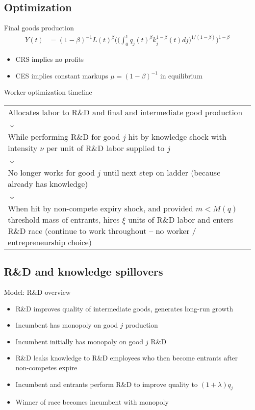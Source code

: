 \subsection{Optimization}
\begin{frame}{Final goods production}
\begin{align*}
Y(t) &= (1-\beta)^{-1} L(t)^{\beta}\Bigg(\Big(\int_0^1 q_j(t)^\beta 
k_j^{1-\beta}(t)dj \Big)^{1/(1-\beta)}\Bigg)^{1-\beta}
\end{align*}
\begin{itemize}
	\item CRS implies no profits
	\item CES implies constant markups $\mu = (1-\beta)^{-1}$ in equilibrium
	
\end{itemize}
\end{frame}

\begin{frame}{Worker optimization timeline}
\begin{table}
	\begin{tabular}{p{}}
		\centering
		Allocates labor to R\&D and final and intermediate good production \\
		$\downarrow$\\
		While performing R\&D for good $j$ hit by knowledge shock with intensity $\nu$ per unit of R\&D labor supplied to $j$ \\
		$\downarrow$\\
		No longer works for good $j$ until next step on ladder (because already has knowledge) \\
		$\downarrow$\\
		When hit by non-compete expiry shock, and provided $m<M(q)$ threshold mass of entrants, hires $\xi$ units of R\&D labor and enters R\&D race (continue to work throughout -- no worker / entrepreneurship choice)
	\end{tabular}
\end{table}
\end{frame}

\subsection{R\&D and knowledge spillovers}
\begin{frame}{Model: R\&D overview}
\begin{itemize}
	\item R\&D improves quality of intermediate goods, generates long-run growth
	\item Incumbent has monopoly on good $j$ production
	\item Incumbent initially has monopoly on good $j$ R\&D
	\item R\&D leaks knowledge to R\&D employees who then become entrants after non-competes expire 
	\item Incumbent and entrants perform R\&D to improve quality to $(1+\lambda) q_j$
	\item Winner of race becomes incumbent with monopoly
\end{itemize}
\end{frame}

